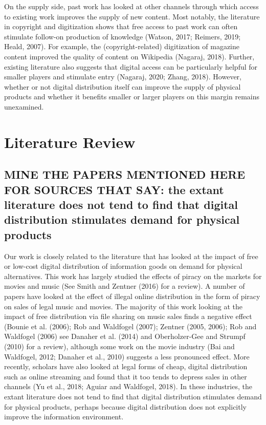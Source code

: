 \documentclass{article}
\begin{document}
On the supply side, past work has looked at other channels through which access to existing work improves the supply of new content. Most notably, the literature in copyright and digitization shows that free access to past work can often stimulate follow-on production of knowledge (Watson, 2017; Reimers, 2019; Heald, 2007). For example, the (copyright-related) digitization of magazine content improved the quality of content on Wikipedia (Nagaraj, 2018). Further, existing literature also suggests that digital access can be particularly helpful for smaller players and stimulate entry (Nagaraj, 2020; Zhang, 2018). However, whether or not digital distribution itself can improve the supply of physical products and whether it benefits smaller or larger players on this margin remains unexamined.

\section{Literature Review}
\subsection{MINE THE PAPERS MENTIONED HERE FOR SOURCES THAT SAY: the extant literature does not tend to find that digital distribution stimulates demand for physical products}
Our work is closely related to the literature that has looked at the impact of free or low-cost digital distribution of information goods on demand for physical alternatives. This work has largely studied the effects of piracy on the markets for movies and music (See Smith and Zentner (2016) for a review). A number of papers have looked at the effect of illegal online distribution in the form of piracy on sales of legal music and movies. The majority of this work looking at the impact of free distribution via file sharing on music sales finds a negative effect (Bounie et al. (2006); Rob and Waldfogel (2007); Zentner (2005, 2006); Rob and Waldfogel (2006) see Danaher et al. (2014) and Oberholzer-Gee and Strumpf (2010) for a review), although some work on the movie industry (Bai and Waldfogel, 2012; Danaher et al., 2010) suggests a less pronounced effect. More recently, scholars have also looked at legal forms of cheap, digital distribution such as online streaming and found that it too tends to depress sales in other channels (Yu et al., 2018; Aguiar and Waldfogel, 2018). In these industries, the extant literature does not tend to find that digital distribution stimulates demand for physical products, perhaps because digital distribution does not explicitly improve the information environment.
\end{document}
